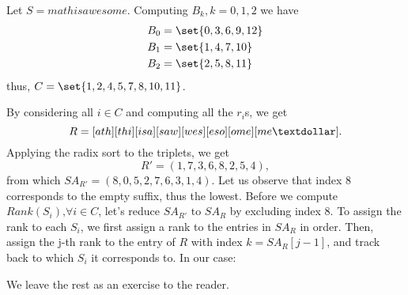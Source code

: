 \documentclass{subfiles}
\begin{document}
    \begin{example*}
        Let \(S = mathisawesome\). Computing \(B_{k}, k = 0, 1, 2\) we have 
        \[\begin{aligned}
            B_{0} & = \set{0, 3, 6, 9, 12} \\
            B_{1} & = \set{1, 4, 7, 10} \\ 
            B_{2} & = \set{2, 5, 8, 11} \\
        \end{aligned}\]
            thus, \(C = \set{1, 2, 4, 5, 7, 8, 10, 11}\).


        By considering all \(i \in C\) and computing all the \(r_{i}\)s,
            we get 
            \[ 
                R = [ath][thi][isa][saw][wes][eso][ome][me\textdollar].
            \]
        Applying the radix sort to the triplets,
            we get 
            \[
                R' = (1, 7, 3, 6, 8, 2, 5, 4), 
            \]
            from which \(SA_{R'} = (8, 0, 5, 2, 7, 6, 3, 1, 4)\).
            Let us observe that index 8 corresponds to the empty suffix,
            thus the lowest.
        Before we compute \(Rank(S_{i})\text{,} \forall i \in C\),
            let's reduce \(SA_{R'} \text{ to } SA_{R}\) by excluding index 8.
            To assign the rank to each \(S_{i}\), 
                we first assign a rank to the entries in \(SA_{R}\) in order.
                Then, assign the j-th rank to the entry of \(R\) with index \(k = SA_{R}[j - 1]\),
                and track back to which \(S_{i}\) it corresponds to.
                In our case:
                

            We leave the rest as an exercise to the reader.
    \end{example*}
\end{document}
